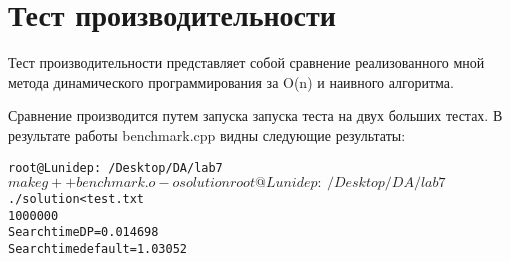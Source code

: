 \section{Тест производительности}

Тест производительности представляет собой сравнение реализованного мной метода
динамического программирования за O(n) и наивного алгоритма.\newline

Сравнение производится путем запуска запуска теста на двух больших тестах.
В результате работы benchmark.cpp видны следующие результаты:

\begin{alltt}
root@Lunidep:~/Desktop/DA/lab7$ make
g++ benchmark.o -o solution
root@Lunidep:~/Desktop/DA/lab7$ ./solution <test.txt
1000000
Search time DP = 0.014698
Search time default = 1.03052
\end{alltt}

\pagebreak